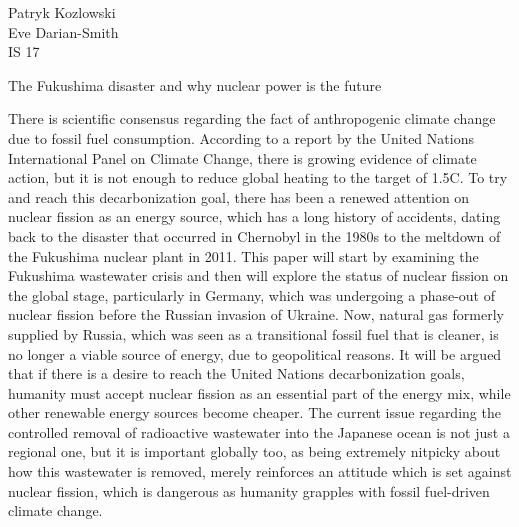 \documentclass[12pt,letterpaper]{article}
\renewcommand{\maketitle}{\makemlaheader}
\renewcommand{\maketitle}{\makemlaheader}
\newcommand{\makemlaheader}{
Patryk Kozlowski \\
Eve Darian-Smith\\
IS 17\\
\begin{center}\textnormal{The Fukushima disaster and why nuclear power is the future}\end{center}

}
\begin{document}
\begin{flushleft}

\setlength{\parindent}{0.5in}

\maketitle
There is scientific consensus regarding the fact of anthropogenic climate change due to fossil fuel consumption. According to a report by the United Nations International Panel on Climate Change, there is growing evidence of climate action, but it is not enough to reduce global heating to the target of 1.5C. \autocite{noauthor_latest_nodate} To try and reach this decarbonization goal, there has been a renewed attention on nuclear fission as an energy source, which has a long history of accidents, dating back to the disaster that occurred in Chernobyl in the 1980s to the meltdown of the Fukushima nuclear plant in 2011. This paper will start by examining the Fukushima wastewater crisis and then will explore the status of nuclear fission on the global stage, particularly in Germany, which was undergoing a phase-out of nuclear fission before the Russian invasion of Ukraine. Now, natural gas formerly supplied by Russia, which was seen as a transitional fossil fuel that is cleaner, is no longer a viable source of energy, due to geopolitical reasons. It will be argued that if there is a desire to reach the United Nations decarbonization goals, humanity must accept nuclear fission as an essential part of the energy mix, while other renewable energy sources become cheaper. The current issue regarding the controlled removal of radioactive wastewater into the Japanese ocean is not just a regional one, but it is important globally too, as being extremely nitpicky about how this wastewater is removed, merely reinforces an attitude which is set against nuclear fission, which is dangerous as humanity grapples with fossil fuel-driven climate change.


\end{flushleft}
\end{document}
